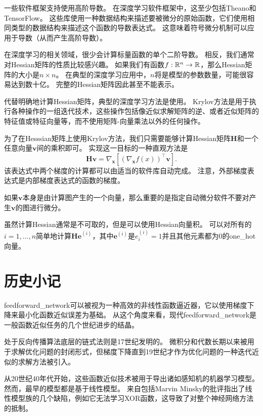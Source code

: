 一些软件框架支持使用高阶导数。 
在深度学习软件框架中，这至少包括Theano和TensorFlow。
这些库使用一种数据结构来描述要被微分的原始函数，它们使用相同类型的数据结构来描述这个函数的导数表达式。
这意味着符号微分机制可以应用于导数（从而产生高阶导数）。

在深度学习的相关领域，很少会计算标量函数的单个二阶导数。
相反，我们通常对Hessian矩阵的性质比较感兴趣。
如果我们有函数$f:\mathbb{R}^n \to \mathbb{R}$，那么Hessian矩阵的大小是$n\times n$。
在典型的深度学习应用中，$n$将是模型的参数数量，可能很容易达到数十亿。
完整的Hessian矩阵因此甚至不能表示。

代替明确地计算Hessian矩阵，典型的深度学习方法是使用。
Krylov方法是用于执行各种操作的一组迭代技术，这些操作包括像近似求解矩阵的逆、或者近似矩阵的特征值或特征向量等，而不使用矩阵-向量乘法以外的任何操作。

为了在Hesssian矩阵上使用Krylov方法，我们只需要能够计算Hessian矩阵$\bm{H}$和一个任意向量$\bm{v}$间的乘积即可。
实现这一目标的一种直观方法\citep{christianson1992automatic}是
\begin{equation}
  \bm{Hv}=\nabla_{\bm{x}} \left [ (\nabla_{\bm{x}} f(x))^\top \bm{v}\right ].
\end{equation}
该表达式中两个梯度的计算都可以由适当的软件库自动完成。
注意，外部梯度表达式是内部梯度表达式的函数的梯度。

如果$\bm{v}$本身是由计算图产生的一个向量，那么重要的是指定自动微分软件不要对产生$\bm{v}$的图进行微分。

虽然计算Hessian通常是不可取的，但是可以使用Hessian向量积。
可以对所有的$i=1,\ldots,n$简单地计算$\bm{He}^{(i)}$，其中$\bm{e}^{(i)}$是$e_i^{(i)}=1$并且其他元素都为0的\gls{one_hot}向量。

\section{历史小记}
\label{sec:historical_notes}

\gls{feedforward_network}可以被视为一种高效的非线性函数逼近器，它以使用梯度下降来最小化函数近似误差为基础。
从这个角度来看，现代\gls{feedforward_network}是一般函数近似任务的几个世纪进步的结晶。
  
  
处于反向传播算法底层的链式法则是17世纪发明的\citep{Leibniz-1676,LHopital-1696}。
微积分和代数长期以来被用于求解优化问题的封闭形式，但梯度下降直到19世纪才作为优化问题的一种迭代近似的求解方法被引入\citep{cauchy1847}。

从20世纪40年代开始，这些函数近似技术被用于导出诸如感知机的机器学习模型。 
然而，最早的模型都是基于线性模型。 
来自包括Marvin Minsky的批评指出了线性模型族的几个缺陷，例如它无法学习XOR函数，这导致了对整个神经网络方法的抵制。

